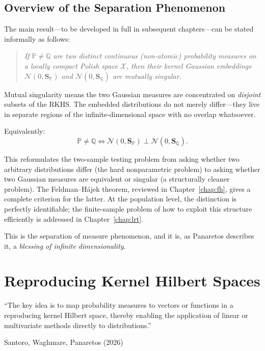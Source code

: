 \documentclass[12pt, oneside]{book}
\theoremstyle{plain}
\theoremstyle{definition}
\newcommand{\calX}{\mathcal{X}}
\newcommand{\calN}{\mathcal{N}}
\newcommand{\PP}{\mathbb{P}}
\newcommand{\QQ}{\mathbb{Q}}
\newcommand{\SP}{\mathbf{S}_{\PP}}
\newcommand{\SQ}{\mathbf{S}_{\QQ}}
\begin{document}
\section{Overview of the Separation Phenomenon}

The main result---to be developed in full in subsequent chapters---can be stated informally as follows:

\begin{quote}
\itshape
If $\PP \neq \QQ$ are two distinct continuous (non-atomic) probability measures on a locally compact Polish space $\calX$, then their kernel Gaussian embeddings $\calN(0, \SP)$ and $\calN(0, \SQ)$ are mutually singular.
\end{quote}

Mutual singularity means the two Gaussian measures are concentrated on \emph{disjoint} subsets of the RKHS. The embedded distributions do not merely differ---they live in separate regions of the infinite-dimensional space with no overlap whatsoever.

Equivalently:
\begin{equation}
\PP \neq \QQ \iff \calN(0, \SP) \perp \calN(0, \SQ).
\end{equation}

This reformulates the two-sample testing problem from asking whether two arbitrary distributions differ (the hard nonparametric problem) to asking whether two Gaussian measures are equivalent or singular (a structurally cleaner problem). The Feldman--H\'ajek theorem, reviewed in Chapter~\ref{chap:fh}, gives a complete criterion for the latter. At the population level, the distinction is perfectly identifiable; the finite-sample problem of how to exploit this structure efficiently is addressed in Chapter~\ref{chap:lrt}.

This is the separation of measure phenomenon, and it is, as Panaretos describes it, a \emph{blessing of infinite dimensionality}.

\chapter{Reproducing Kernel Hilbert Spaces}
\label{chap:rkhs}

\epigraph{``The key idea is to map probability measures to vectors or functions
in a reproducing kernel Hilbert space, thereby enabling the application of linear
or multivariate methods directly to distributions.''}{Santoro, Waghmare, Panaretos (2026)}
\end{document}

